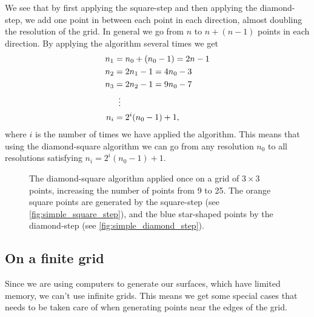 We see that by first applying the square-step and then applying the diamond-step, we add one point in between each point in each direction, almost doubling the resolution of the grid. In general we go from $n$ to $n + (n-1)$ points in each direction. By applying the algorithm several times we get 
\begin{align}
    n_1 &= n_0 + (n_0-1) = 2n - 1 \nonumber\\
    n_2 &= 2n_1 - 1 = 4n_0 - 3 \nonumber\\
    n_3 &= 2n_2 - 1 = 9n_0 - 7 \nonumber\\
    &\vdotswithin{=} \nonumber\\
    n_i &= 2^i(n_0-1) + 1, \label{eq:diamond_step_resolution}
\end{align}
where $i$ is the number of times we have applied the algorithm. This means that using the diamond-square algorithm we can go from any resolution $n_0$ to all resolutions satisfying $n_i = 2^i(n_0 - 1) + 1$.
%
\begin{figure}[htpb]%
    \centering%
    \caption{%
        The diamond-square algorithm applied once on a grid of $3\times 3$ points, increasing the number of points from 9 to 25. The orange square points are generated by the square-step (see \cref{fig:simple_square_step}), and the blue star-shaped points by the diamond-step (see \cref{fig:simple_diamond_step}).%
    }%
    \label{fig:diamond_square_applied}%
\end{figure}%

\subsection{On a finite grid}
Since we are using computers to generate our surfaces, which have limited memory, we can't use infinite grids. This means we get some special cases that needs to be taken care of when generating points near the edges of the grid.

